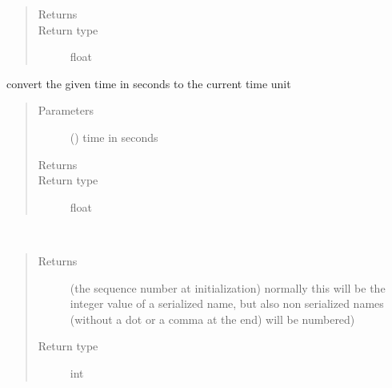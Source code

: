 \documentclass[letterpaper,10pt,english]{sphinxmanual}
\begin{document}
\begin{fulllineitems}
\begin{fulllineitems}
\begin{quote}
\begin{description}
\item[{Returns}] \leavevmode
{}

\item[{Return type}] \leavevmode
float

\end{description}\end{quote}

\end{fulllineitems}


\begin{fulllineitems}
\label{\detokenize{Reference:salabim.Environment.seconds}}
convert the given time in seconds to the current time unit
\begin{quote}\begin{description}
\item[{Parameters}] \leavevmode
{} () \textendash{} time in seconds

\item[{Returns}] \leavevmode
{}

\item[{Return type}] \leavevmode
float

\end{description}\end{quote}

\end{fulllineitems}


\begin{fulllineitems}
\label{\detokenize{Reference:salabim.Environment.sequence_number}}~\begin{quote}\begin{description}
\item[{Returns}] \leavevmode
{} \textendash{} (the sequence number at initialization) 
normally this will be the integer value of a serialized name,
but also non serialized names (without a dot or a comma at the end)
will be numbered)

\item[{Return type}] \leavevmode
int


\end{description}
\end{quote}
\end{fulllineitems}
\end{fulllineitems}
\end{document}
